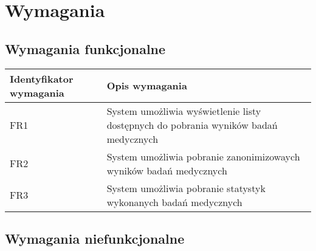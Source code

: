 \chapter{Wymagania}



\section{Wymagania funkcjonalne}

  \begin{longtable}{| p{} || p{} |} 
\hline
\textbf{Identyfikator wymagania} & \textbf{Opis wymagania} \\ \hline
FR1 & System umożliwia wyświetlenie listy dostępnych do pobrania wyników badań medycznych \\ \hline
FR2 & System umożliwia pobranie zanonimizowaych wyników badań medycznych
 \\ \hline
FR3 & System umożliwia pobranie statystyk wykonanych badań medycznych
 \\ \hline
  \end{longtable} 

\section{Wymagania niefunkcjonalne}

